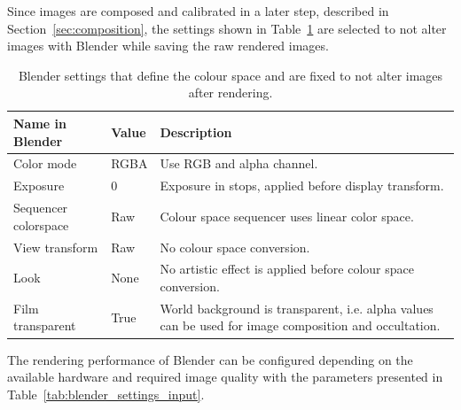 Since images are composed and calibrated in a later step, described in Section~\ref{sec:composition}, the settings shown in Table~\ref{tab:color_space} are selected to not alter images with Blender while saving the raw rendered images.
\begin{table}[htb]
    \centering
    \caption{Blender settings that define the colour space and are fixed to not alter images after rendering.}
    \label{tab:color_space}
    \begin{tabular}{p{}|p{}|p{}}
        \textbf{Name in Blender}        & \textbf{Value} & \textbf{Description} \\ \hline
        Color mode           & RGBA           & Use RGB and alpha channel. \\
        Exposure             & 0              & Exposure in stops, applied before display transform. \\
        Sequencer colorspace & Raw            & Colour space sequencer uses linear color space. \\
        View transform       & Raw            & No colour space conversion. \\
        Look                 & None           & No artistic effect is applied before colour space conversion. \\
        Film transparent     & True           & World background is transparent, i.e. alpha values can be used for image composition and occultation.
    \end{tabular}
\end{table}

The rendering performance of Blender can be configured depending on the available hardware and required image quality with the parameters presented in Table~\ref{tab:blender_settings_input}.
\begin{table}[htb]
    \centering
    \caption{Input parameters that that affect rendering performance and image quality in~\gls{sispo}.}
    \label{tab:blender_settings_input}
\end{table}

